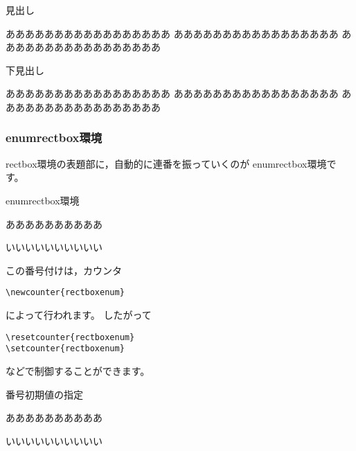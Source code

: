 \begin{showEx}{見出し}
\begin{rectbox}[framecolor=red,%
  backgroundcolor=cyan,%
  item=見出し,itempos=c,%
  midasibackgroundcolor=lightgray]
あああああああああああああああああ
あああああああああああああああああ
あああああああああああああああああ
\end{rectbox}
\end{showEx}

\begin{showEx}{下見出し}
\begin{rectbox}[framecolor=red,%
  backgroundcolor=cyan,%
  bitem=下見出し,bitempos=l,%
  midasibackgroundcolor=lightgray]
あああああああああああああああああ
あああああああああああああああああ
あああああああああああああああああ
\end{rectbox}
\end{showEx}

\subsubsection{\textsf{enumrectbox}環境}
\textsf{rectbox}環境の表題部に，自動的に連番を振っていくのが
\textsf{enumrectbox}環境です。

\begin{showEx}{\textsf{enumrectbox}環境}
\begin{enumrectbox}
ああああああああああ
\end{enumrectbox}

\begin{enumrectbox}
いいいいいいいいいい
\end{enumrectbox}
\end{showEx}

この番号付けは，カウンタ

\begin{boxnote}
\begin{verbatim}
\newcounter{rectboxenum}
\end{verbatim}
\end{boxnote}
\noindent
によって行われます。
したがって
\begin{jquote}
\verb+\resetcounter{rectboxenum}+\\
\verb+\setcounter{rectboxenum}+
\end{jquote}
などで制御することができます。

\begin{showEx}{番号初期値の指定}
\setcounter{rectboxenum}{100}
\begin{enumrectbox}
ああああああああああ
\end{enumrectbox}

\begin{enumrectbox}
いいいいいいいいいい
\end{enumrectbox}
\end{showEx}

